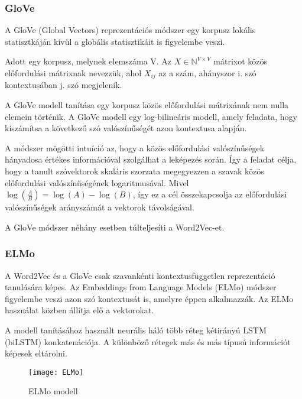 \subsubsection{GloVe}
A GloVe (Global Vectors) reprezentációs módszer egy korpusz lokális statisztkáján kívül a globális statisztikáit is figyelembe veszi. 

\begin{definition}
	Adott egy korpusz, melynek elemszáma V. Az $X \in \mathbb{N}^{V \times V}$ mátrixot közös előfordulási mátrixnak nevezzük, ahol $X_{ij}$ az a szám, ahányszor i. szó kontextusában j. szó megjelenik.  
\end{definition}

A GloVe modell tanítása egy korpusz közös előfordulási mátrixának nem nulla elemein történik. A GloVe modell egy log-bilineáris modell, amely feladata, hogy kiszámítsa a következő szó valószínűségét azon kontextusa alapján.

A módszer mögötti intuíció az, hogy a közös előfordulási valószínűségek hányadosa értékes információval szolgálhat a leképezés során. Így a feladat célja, hogy a tanult szóvektorok skaláris szorzata megegyezzen a szavak közös előfordulási valószínűségének logaritmusával. Mivel $\log \left( \frac{A}{B} \right) = \log \left( A \right) - \log \left( B \right)$, így ez a cél összekapcsolja az előfordulási valószínűségek arányszámát a vektorok távolságával.

\begin{note}
	A GloVe módszer néhány esetben túlteljesíti a Word2Vec-et.
\end{note}

\subsubsection{ELMo}
A Word2Vec és a GloVe csak szavankénti kontextusfüggetlen reprezentáció tanulására képes. Az Embeddings from Language Models (ELMo) módszer figyelembe veszi azon szó kontextusát is, amelyre éppen alkalmazzák. Az ELMo használat közben állítja elő a vektorokat.

A modell tanításához használt neurális háló több réteg kétirányú LSTM (biLSTM) konkatenációja. A különböző rétegek más és más típusú információt képesek eltárolni.

\begin{figure}[H]
	\centering
	\texttt{[image: ELMo]}
	\caption{ELMo modell}
\end{figure}

